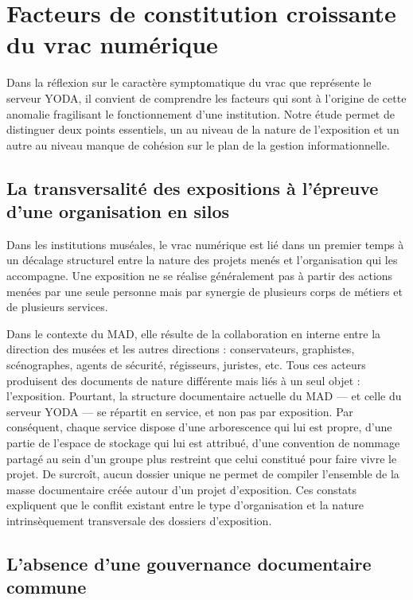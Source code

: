 \section{Facteurs de constitution croissante du vrac  numérique}

Dans la réflexion sur le caractère symptomatique du vrac que représente le serveur YODA, il convient de comprendre les facteurs qui sont à l’origine de cette anomalie fragilisant  le fonctionnement d’une institution. Notre étude permet de distinguer deux points essentiels, un au niveau de la nature de l’exposition et un autre au niveau manque de cohésion sur le plan de la gestion informationnelle.


\subsection*{La transversalité des expositions à l’épreuve d’une organisation en silos}

Dans les institutions muséales, le vrac numérique est lié dans un premier temps à un décalage structurel entre la nature des projets menés et l’organisation qui les accompagne. Une exposition ne se réalise généralement pas à partir des actions menées par une seule personne mais par  synergie de plusieurs corps de métiers et de plusieurs services.

Dans le contexte du MAD, elle résulte de la collaboration en interne entre la direction des musées et les autres directions : conservateurs, graphistes, scénographes, agents de sécurité, régisseurs, juristes, etc. Tous ces acteurs produisent des documents de nature différente mais liés à un seul objet : l’exposition. Pourtant, la structure documentaire actuelle du MAD — et celle du serveur YODA — se répartit en service, et non pas par exposition. Par conséquent, chaque service dispose d’une arborescence qui lui est propre, d’une partie de l’espace de stockage qui lui est attribué, d’une convention de nommage partagé au sein d’un groupe plus restreint que celui constitué pour faire vivre le projet. De surcroît, aucun dossier unique ne permet de compiler l’ensemble de la masse documentaire créée autour d’un projet d’exposition. Ces constats expliquent que le conflit existant entre le type d'organisation et la nature intrinsèquement transversale des dossiers d’exposition.


\subsection*{L’absence d’une gouvernance documentaire commune}


